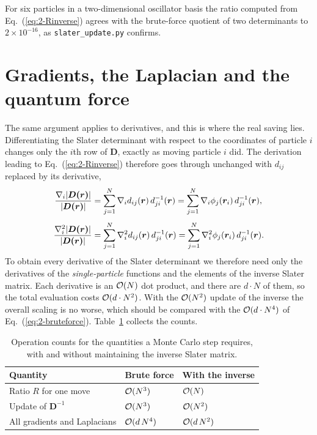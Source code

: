 For six particles in a two-dimensional oscillator basis the ratio computed
from Eq.~(\ref{eq:2-Rinverse}) agrees with the brute-force quotient of two
determinants to $2\times10^{-16}$, as \texttt{slater\_update.py} confirms.

\section{Gradients, the Laplacian and the quantum force}
\label{sec:slatergradients}

The same argument applies to derivatives, and this is where the real saving
lies.  Differentiating the Slater determinant with respect to the coordinates
of particle $i$ changes only the $i$th row of $\bm{D}$, exactly as moving
particle $i$ did.  The derivation leading to Eq.~(\ref{eq:2-Rinverse})
therefore goes through unchanged with $d_{ij}$ replaced by its derivative,
\begin{align}
  \frac{\nabla_i{|\boldsymbol{D(\bm{r})}|}}{{|\boldsymbol{D(\bm{r})}|}}
   &= \sum_{j=1}^{N}\nabla_i d_{ij}(\bm{r})\,d^{-1}_{ji}(\bm{r})
    = \sum_{j=1}^{N}\nabla_i\phi_j(\bm{r}_i)\,d^{-1}_{ji}(\bm{r}),
  \label{eq:2-gradratio}\\[4pt]
  \frac{\nabla_i^2{|\boldsymbol{D(\bm{r})}|}}{{|\boldsymbol{D(\bm{r})}|}}
   &= \sum_{j=1}^{N}\nabla_i^2 d_{ij}(\bm{r})\,d^{-1}_{ji}(\bm{r})
    = \sum_{j=1}^{N}\nabla_i^2\phi_j(\bm{r}_i)\,d^{-1}_{ji}(\bm{r}).
  \label{eq:2-lapratio}
\end{align}
To obtain every derivative of the Slater determinant we therefore need only
the derivatives of the \emph{single-particle} functions and the elements of
the inverse Slater matrix.  Each derivative is an $\mathcal{O}(N)$ dot product, and
there are $d\cdot N$ of them, so the total evaluation costs $\mathcal{O}(d\cdot
N^2)$.  With the $\mathcal{O}(N^2)$ update of the inverse the overall scaling is no
worse, which should be compared with the $\mathcal{O}(d\cdot N^4)$ of
Eq.~(\ref{eq:2-bruteforce}).  Table~\ref{tab:vmcscaling} collects the counts.

\begin{table}[h]
\centering
\renewcommand{\arraystretch}{1.25}
\setlength{\tabcolsep}{10pt}
\begin{tabular}{lll}
\toprule
\textbf{Quantity} & \textbf{Brute force} & \textbf{With the inverse}\\
\midrule
Ratio $R$ for one move            & $\mathcal{O}(N^3)$      & $\mathcal{O}(N)$\\
Update of $\bm{D}^{-1}$           & $\mathcal{O}(N^3)$      & $\mathcal{O}(N^2)$\\
All gradients and Laplacians      & $\mathcal{O}(d\,N^4)$   & $\mathcal{O}(d\,N^2)$\\
\bottomrule
\end{tabular}
\caption{Operation counts for the quantities a Monte Carlo step requires,
with and without maintaining the inverse Slater matrix.}
\label{tab:vmcscaling}
\end{table}

